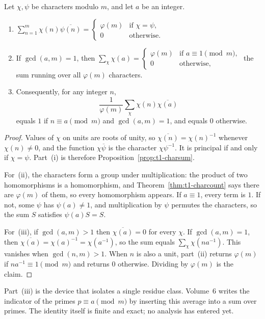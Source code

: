 \begin{theorem}[orthogonality]\label{thm:t1-ortho}
Let $\chi,\psi$ be characters modulo $m$, and let $a$ be an integer.
\begin{enumerate}[label=(\roman*)]
\item $\displaystyle\sum_{n=1}^m\chi(n)\overline{\psi(n)}=\begin{cases}\varphi(m)&\text{if }\chi=\psi,\\0&\text{otherwise.}\end{cases}$
\item If $\gcd(a,m)=1$, then $\displaystyle\sum_{\chi}\chi(a)=\begin{cases}\varphi(m)&\text{if }a\equiv1\pmod m,\\0&\text{otherwise,}\end{cases}$ the sum running over all $\varphi(m)$ characters.
\item Consequently, for any integer $n$,
\[
\frac1{\varphi(m)}\sum_{\chi}\chi(n)\overline{\chi(a)}
\]
equals $1$ if $n\equiv a\pmod m$ and $\gcd(a,m)=1$, and equals $0$ otherwise.
\end{enumerate}
\end{theorem}
\begin{proof}
Values of $\chi$ on units are roots of unity, so $\overline{\chi(n)}=\chi(n)^{-1}$ whenever $\chi(n)\ne0$, and the function $\chi\overline{\psi}$ is the character $\chi\psi^{-1}$. It is principal if and only if $\chi=\psi$. Part~(i) is therefore Proposition~\ref{prop:t1-charsum}.

For~(ii), the characters form a group under multiplication: the product of two homomorphisms is a homomorphism, and Theorem~\ref{thm:t1-charcount} says there are $\varphi(m)$ of them, so every homomorphism appears. If $a\equiv1$, every term is $1$. If not, some $\psi$ has $\psi(a)\ne1$, and multiplication by $\psi$ permutes the characters, so the sum $S$ satisfies $\psi(a)S=S$.

For~(iii), if $\gcd(a,m)>1$ then $\overline{\chi(a)}=0$ for every $\chi$. If $\gcd(a,m)=1$, then $\overline{\chi(a)}=\chi(a)^{-1}=\chi(a^{-1})$, so the sum equals $\sum_{\chi}\chi(na^{-1})$. This vanishes when $\gcd(n,m)>1$. When $n$ is also a unit, part~(ii) returns $\varphi(m)$ if $na^{-1}\equiv1\pmod m$ and returns $0$ otherwise. Dividing by $\varphi(m)$ is the claim.
\end{proof}

Part~(iii) is the device that isolates a single residue class. Volume~6 writes the indicator of the primes $p\equiv a\pmod m$ by inserting this average into a sum over primes. The identity itself is finite and exact; no analysis has entered yet.

